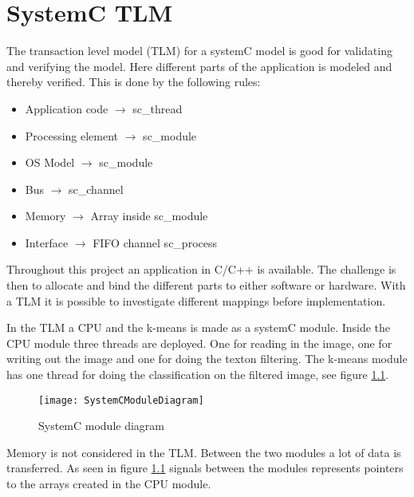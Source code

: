 \chapter{SystemC TLM}
The transaction level model (TLM) for a systemC model is good for validating and verifying the model. 
Here different parts of the application is modeled and thereby verified. This is done by the following rules:

\begin{itemize}
  	\item Application code $\rightarrow$ sc\_thread
  	\item Processing element $\rightarrow$ sc\_module
	\item OS Model $\rightarrow$ sc\_module
	\item Bus $\rightarrow$ sc\_channel
	\item Memory $\rightarrow$ Array inside sc\_module
	\item Interface $\rightarrow$ FIFO channel sc\_process
\end{itemize}


Throughout this project an application in C/C++ is available. The challenge is then to allocate and bind the different parts to either software or hardware. With a TLM it is possible to investigate different mappings before implementation. 

In the TLM a CPU and the k-means is made as a systemC module. Inside the CPU module three threads are deployed. One for reading in the image, one for writing out the image and one for doing the texton filtering. 
The k-means module has one thread for doing the classification on the filtered image, see figure \ref{fig:TLM}.

\begin{figure}[H]
\centering
\texttt{[image: SystemCModuleDiagram]}
\caption{SystemC module diagram}
\label{fig:TLM}
\end{figure}

Memory is not considered in the TLM. Between the two modules a lot of data is transferred. 
As seen in figure \ref{fig:TLM} signals between the modules represents pointers to the arrays created in the CPU module. 


